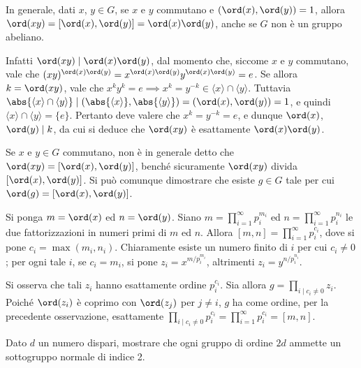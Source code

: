 \documentclass[11pt]{scrartcl}
\begin{document}
	\begin{remark}
		In generale, dati $x$, $y\in G$, se $x$ e $y$ commutano e $(\ord(x),\ord(y)) = 1$, allora 
		$\ord(xy) = [\ord(x), \ord(y)] = \ord(x) \ord(y)$, anche se $G$ non è un gruppo abeliano. \medskip
		
		Infatti $\ord(xy) \mid \ord(x) \ord(y)$, dal momento
		che, siccome $x$ e $y$ commutano, vale che $(xy)^{\ord(x) \ord(y)} = x^{\ord(x) \ord(y)} y^{\ord(x) \ord(y)} = e$.
		Se allora $k = \ord(xy)$, vale che
		$x^k y^k = e \implies x^k = y^{-k} \in \langle x \rangle \cap \langle y \rangle$.
		Tuttavia $\abs{\langle x \rangle \cap \langle y \rangle} \mid
		(\abs{\langle x \rangle}, \abs{\langle y \rangle}) = (\ord(x), \ord(y)) =
		1$, e quindi $\langle x \rangle \cap \langle y \rangle = \{e\}$. Pertanto
		deve valere che $x^k = y^{-k} = e$, e dunque
		$\ord(x)$, $\ord(y) \mid k$, da cui si deduce che
		$\ord(xy)$ è esattamente $\ord(x) \ord(y)$.
	\end{remark}
	
	\begin{remark}
		Se $x$ e $y \in G$ commutano, non è in generale detto che
		$\ord(xy) = [\ord(x), \ord(y)]$, benché sicuramente
		$\ord(xy)$ divida $[\ord(x), \ord(y)]$. Si può comunque dimostrare che esiste
		$g \in G$ tale per cui $\ord(g) = [\ord(x), \ord(y)]$. \medskip
		
		Si ponga $m = \ord(x)$ ed $n = \ord(y)$. Siano $m = \prod_{i = 1}^\infty p_i^{m_i}$
		ed $n = \prod_{i = 1}^\infty p_i^{n_i}$ le due fattorizzazioni in numeri primi
		di $m$ ed $n$. Allora $[m, n] = \prod_{i = 1}^\infty p_i^{c_i}$,
		dove si pone $c_i = \max(m_i, n_i)$. Chiaramente esiste un numero finito di
		$i$ per cui $c_i \neq 0$; per ogni tale $i$, se $c_i = m_i$, si pone
		$z_i = x^{m /p_i^{m_i}}$, altrimenti
		$z_i = y^{n / p_i^{n_i}}$. \medskip
		
		
		Si osserva che tali $z_i$ hanno esattamente ordine $p_i^{c_i}$.
		Sia allora $g = \prod_{i \mid c_i \neq 0} z_i$. Poiché $\ord(z_i)$ è coprimo
		con $\ord(z_j)$ per $j \neq i$, $g$ ha come ordine, per la precedente osservazione,
		esattamente $\prod_{i \mid c_i \neq 0} p_i^{c_i} = \prod_{i = 1}^\infty p_i^{c_i} =
		[m, n]$.
	\end{remark}
	
	\begin{exercise}
		\label{ex1.48}
		Dato $d$ un numero dispari, mostrare che ogni gruppo di ordine $2d$ ammette
		un sottogruppo normale di indice 2.
	\end{exercise}
	
\end{document}

